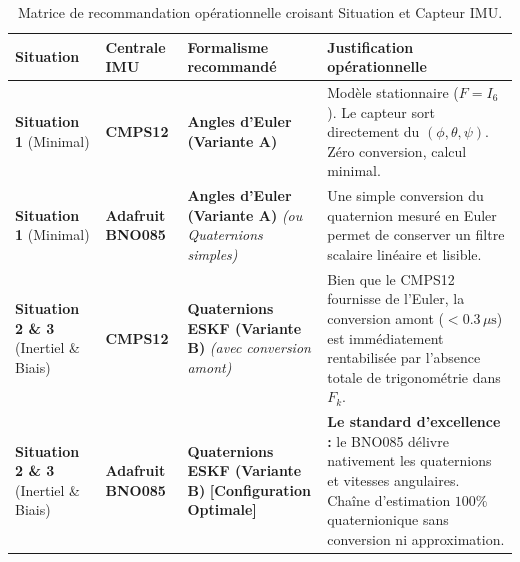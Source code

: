 \documentclass[../Formulations_Kalman.tex]{subfiles}
\begin{document}
\begin{table}[htbp]
\centering
\small
\begin{tabular}{p{2.8cm} p{3.2cm} p{4.0cm} p{4.8cm}}
\toprule
\textbf{Situation} & \textbf{Centrale IMU} & \textbf{Formalisme recommandé} & \textbf{Justification opérationnelle} \\
\midrule
\textbf{Situation 1} \newline (Minimal) & \textbf{CMPS12} & \textbf{Angles d'Euler (Variante A)} & Modèle stationnaire ($F=I_6$). Le capteur sort directement du $(\phi, \theta, \psi)$. Zéro conversion, calcul minimal. \\
\midrule
\textbf{Situation 1} \newline (Minimal) & \textbf{Adafruit BNO085} & \textbf{Angles d'Euler (Variante A)} \newline \textit{(ou Quaternions simples)} & Une simple conversion du quaternion mesuré en Euler permet de conserver un filtre scalaire linéaire et lisible. \\
\midrule
\textbf{Situation 2 \& 3} \newline (Inertiel \& Biais) & \textbf{CMPS12} & \textbf{Quaternions ESKF (Variante B)} \newline \textit{(avec conversion amont)} & Bien que le CMPS12 fournisse de l'Euler, la conversion amont ($< 0.3\,\mu\text{s}$) est immédiatement rentabilisée par l'absence totale de trigonométrie dans $F_k$. \\
\midrule
\textbf{Situation 2 \& 3} \newline (Inertiel \& Biais) & \textbf{Adafruit BNO085} & \textbf{Quaternions ESKF (Variante B)} \newline \textbf{[Configuration Optimale]} & \textbf{Le standard d'excellence :} le BNO085 délivre nativement les quaternions et vitesses angulaires. Chaîne d'estimation $100\%$ quaternionique sans conversion ni approximation. \\
\bottomrule
\end{tabular}
\caption{Matrice de recommandation opérationnelle croisant Situation et Capteur IMU.}
\label{tab:matrice_decision}
\end{table}
\end{document}
